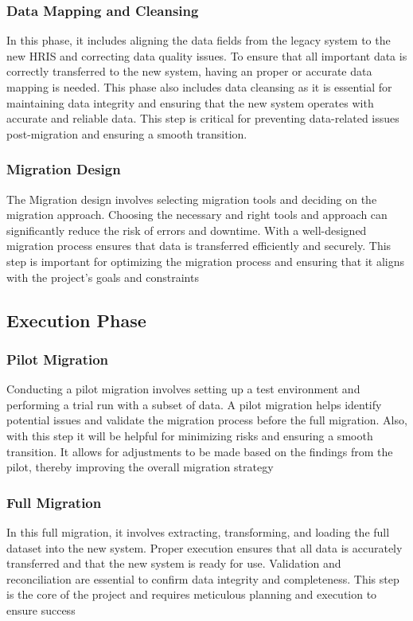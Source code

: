         \subsubsection{Data Mapping and Cleansing}
            In this phase, it includes aligning the data fields from the legacy system to the new HRIS and correcting data quality issues. To ensure that all important data is correctly transferred to the new system, having an proper or accurate data mapping is needed. This phase also includes data cleansing as it is essential for maintaining data integrity and ensuring that the new system operates with accurate and reliable data. This step is critical for preventing data-related issues post-migration and ensuring a smooth transition.

        \subsubsection{Migration Design}
            The Migration design involves selecting migration tools  and deciding on the migration approach. Choosing the necessary and right tools and approach can significantly reduce the risk of errors and downtime. With a well-designed migration process ensures that data is transferred efficiently and securely. This step is important for optimizing the migration process and ensuring that it aligns with the project's goals and constraints
        
    \subsection{Execution Phase}
        \subsubsection{Pilot Migration}
            Conducting a pilot migration involves setting up a test environment and performing a trial run with a subset of data. A pilot migration helps identify potential issues and validate the migration process before the full migration. Also, with this step it will be helpful for minimizing risks and ensuring a smooth transition. It allows for adjustments to be made based on the findings from the pilot, thereby improving the overall migration strategy

        \subsubsection{Full Migration}
            In this full migration, it involves extracting, transforming, and loading the full dataset into the new system. Proper execution ensures that all data is accurately transferred and that the new system is ready for use. Validation and reconciliation are essential to confirm data integrity and completeness. This step is the core of the project and requires meticulous planning and execution to ensure success

